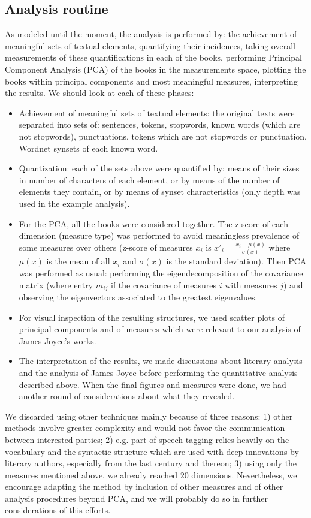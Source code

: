 \documentclass[12pt,fleqn]{article}
\begin{document}
\subsection{Analysis routine}
As modeled until the moment, the analysis is performed by: the achievement of meaningful sets of textual elements,
quantifying their incidences, taking overall measurements of these quantifications in each of the books,  
performing Principal Component Analysis (PCA) of the books in the measurements space, plotting the books within principal components
and most meaningful measures, interpreting the results.
We should look at each of these phases:
\begin{itemize}
    \item Achievement of meaningful sets of textual elements: the original texts were separated into sets of: sentences, tokens, stopwords, known words (which are not stopwords), punctuations, tokens which are not stopwords or punctuation, Wordnet synsets of each known word.
    \item Quantization: each of the sets above were quantified by: means of their sizes in number of characters of each element, or by means of the number of elements they contain, or by means of synset characteristics (only depth was used in the example analysis).
    \item For the PCA, all the books were considered together. The z-score of each dimension (measure type) was performed to avoid meaningless prevalence of some measures over others (z-score of measures $x_i$ is $x'_i = \frac{x_i-\mu(x)}{\sigma(x)}$ where $\mu(x)$ is the mean of all $x_i$ and $\sigma(x)$ is the standard deviation). Then PCA was performed as usual: performing the eigendecomposition of the covariance matrix (where entry $m_{ij}$ if the covariance of measures $i$ with measures $j$) and observing the eigenvectors associated to the greatest eigenvalues.
    \item For visual inspection of the resulting structures, we used scatter plots of principal components and of measures which were relevant to our analysis of James Joyce's works.
    \item The interpretation of the results, we made discussions about literary analysis and the analysis of James Joyce before performing the quantitative analysis described above.
        When the final figures and measures were done, we had another round of considerations about what they revealed.
\end{itemize}

We discarded using other techniques mainly because of three reasons:
1) other methods involve greater complexity and would not favor the communication between interested parties;
2) e.g. part-of-speech tagging relies heavily on the vocabulary and the syntactic structure
which are used with deep innovations by literary authors, especially from the last century and thereon;
3) using only the measures mentioned above, we already reached 20 dimensions.
Nevertheless, we encourage adapting the method by inclusion of other measures and of other analysis procedures beyond PCA,
and we will probably do so in further considerations of this efforts.
\end{document}
